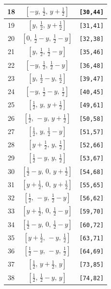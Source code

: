 \documentclass[fleqn,8pt]{jsarticle}
\begin{document}
\begin{longtable}{ccc}
18 & $\left[ - y,\, \frac{1}{2},\, y + \frac{1}{2} \right]$ & {\tt [30,44]} \\ \hline
19 & $\left[ y,\, \frac{1}{2},\, y + \frac{1}{2} \right]$ & {\tt [31,41]} \\ \hline
20 & $\left[ 0,\, \frac{1}{2} - y,\, \frac{1}{2} - y \right]$ & {\tt [32,38]} \\ \hline
21 & $\left[ y,\, \frac{1}{2},\, \frac{1}{2} - y \right]$ & {\tt [35,46]} \\ \hline
22 & $\left[ - y,\, \frac{1}{2},\, \frac{1}{2} - y \right]$ & {\tt [36,48]} \\ \hline
23 & $\left[ y,\, \frac{1}{2} - y,\, \frac{1}{2} \right]$ & {\tt [39,47]} \\ \hline
24 & $\left[ - y,\, \frac{1}{2} - y,\, \frac{1}{2} \right]$ & {\tt [40,45]} \\ \hline
25 & $\left[ \frac{1}{2},\, y,\, y + \frac{1}{2} \right]$ & {\tt [49,61]} \\ \hline
26 & $\left[ \frac{1}{2},\, - y,\, y + \frac{1}{2} \right]$ & {\tt [50,58]} \\ \hline
27 & $\left[ \frac{1}{2},\, y,\, \frac{1}{2} - y \right]$ & {\tt [51,57]} \\ \hline
28 & $\left[ y + \frac{1}{2},\, y,\, \frac{1}{2} \right]$ & {\tt [52,66]} \\ \hline
29 & $\left[ \frac{1}{2} - y,\, y,\, \frac{1}{2} \right]$ & {\tt [53,67]} \\ \hline
30 & $\left[ \frac{1}{2} - y,\, 0,\, y + \frac{1}{2} \right]$ & {\tt [54,68]} \\ \hline
31 & $\left[ y + \frac{1}{2},\, 0,\, y + \frac{1}{2} \right]$ & {\tt [55,65]} \\ \hline
32 & $\left[ \frac{1}{2},\, - y,\, \frac{1}{2} - y \right]$ & {\tt [56,62]} \\ \hline
33 & $\left[ y + \frac{1}{2},\, 0,\, \frac{1}{2} - y \right]$ & {\tt [59,70]} \\ \hline
34 & $\left[ \frac{1}{2} - y,\, 0,\, \frac{1}{2} - y \right]$ & {\tt [60,72]} \\ \hline
35 & $\left[ y + \frac{1}{2},\, - y,\, \frac{1}{2} \right]$ & {\tt [63,71]} \\ \hline
36 & $\left[ \frac{1}{2} - y,\, - y,\, \frac{1}{2} \right]$ & {\tt [64,69]} \\ \hline
37 & $\left[ \frac{1}{2},\, y + \frac{1}{2},\, y \right]$ & {\tt [73,85]} \\ \hline
38 & $\left[ \frac{1}{2},\, \frac{1}{2} - y,\, y \right]$ & {\tt [74,82]} \\ \hline

\end{longtable}
\end{document}
